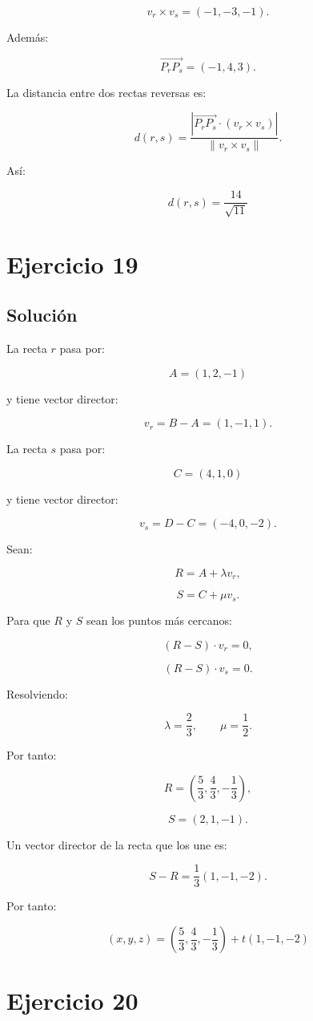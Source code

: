 \documentclass[11pt,a4paper]{article}
\begin{document}
\[
v_r\times v_s
=
(-1,-3,-1).
\]

Además:

\[
\overrightarrow{P_rP_s}
=
(-1,4,3).
\]

La distancia entre dos rectas reversas es:

\[
d(r,s)
=
\frac{
\left|
\overrightarrow{P_rP_s}
\cdot
(v_r\times v_s)
\right|
}{
\|v_r\times v_s\|
}.
\]

Así:

\[
\boxed{
d(r,s)
=
\frac{14}{\sqrt{11}}
}
\]

\section{Ejercicio 19}
\subsection{Solución}

La recta \(r\) pasa por:

\[
A=(1,2,-1)
\]

y tiene vector director:

\[
v_r
=
B-A
=
(1,-1,1).
\]

La recta \(s\) pasa por:

\[
C=(4,1,0)
\]

y tiene vector director:

\[
v_s
=
D-C
=
(-4,0,-2).
\]

Sean:

\[
R=A+\lambda v_r,
\]

\[
S=C+\mu v_s.
\]

Para que \(R\) y \(S\) sean los puntos más cercanos:

\[
(R-S)\cdot v_r=0,
\]

\[
(R-S)\cdot v_s=0.
\]

Resolviendo:

\[
\lambda=\frac23,
\qquad
\mu=\frac12.
\]

Por tanto:

\[
R=
\left(
\frac53,
\frac43,
-\frac13
\right),
\]

\[
S=(2,1,-1).
\]

Un vector director de la recta que los une es:

\[
S-R
=
\frac13(1,-1,-2).
\]

Por tanto:

\[
\boxed{
(x,y,z)
=
\left(
\frac53,
\frac43,
-\frac13
\right)
+
t(1,-1,-2)
}
\]

\section{Ejercicio 20}
\end{document}
